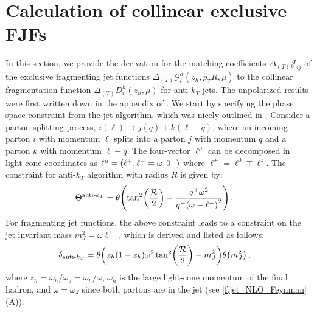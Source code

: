 \documentclass[a4paper, 11 pt]{article}
\begin{document}
\section{Calculation of collinear exclusive FJFs}
\label{s.exclusive_FJF_calculation}

In this section, we provide the derivation for the matching coefficients $\Delta_{(T)}\mathscr{J}_{i j}$ of the exclusive fragmenting jet functions $\Delta_{(T)}\mathscr{G}_i^h(z_h, p_TR, \mu)$ to the collinear fragmentation function $\Delta_{(T)}D_i^h(z_h, \mu)$ for anti-${k}_{T}$ jets.
The unpolarized results were first written down in the appendix of \cite{Waalewijn:2012sv}.
We start by specifying the phase space constraint from the jet algorithm, which was nicely outlined in \cite{Ellis:2010rwa}.
Consider a parton splitting process, $i(\ell) \rightarrow j(q) + k(\ell-q)$, where an incoming parton $i$ with momentum $\ell$ splits into a parton $j$ with momentum $q$ and a parton $k$ with momentum $\ell-q$.
The four-vector $\ell^{\mu}$ can be decomposed in light-cone coordinates as $\ell^{\mu} = \pqty{\ell^+, \ell^- = \omega, 0_{\perp}}$ where $\ell^{\pm} = \ell^0 \mp \ell^z$.
The constraint for anti-$k_T$ algorithm with radius $R$ is given by:
\begin{align}
\Theta^{\text{anti-}k_T}
& =
\theta \pqty{\tan[2](\frac{\mathcal{R}}{2}) - \frac{q^+ \omega^2}{q^- \pqty{\omega - \ell^-}^2}}
\, .
\end{align}
For fragmenting jet functions, the above constraint leads to a constraint on the jet invariant mass $m_J^2 = \omega \ell^{+}$ \cite{Procura:2011aq}, which is derived and listed as follows:
\begin{align}
\delta_{\text{anti-}k_T}
& =
\theta \pqty{z_h (1-z_h) \omega ^2 \tan[2](\frac{\mathcal{R}}{2}) - m_J^2}
\theta \pqty{m_J^2} \,,
\end{align}
where $z_h = \omega _h / \omega _J = \omega _h / \omega$, $\omega _h$ is the large light-cone momentum of the final hadron, and $\omega = \omega _J$ since both partons are in the jet (see \cref{f.jet_NLO_Feynman} (A)).
\renewcommand{\arraystretch}{2}
\end{document}
